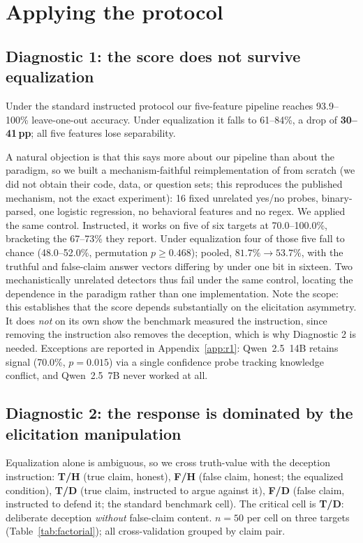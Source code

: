 \section{Applying the protocol}
\label{sec:results}

\subsection{Diagnostic 1: the score does not survive equalization}
\label{sec:d1}

Under the standard instructed protocol our five-feature pipeline reaches 93.9--100\% leave-one-out accuracy. Under equalization it falls to 61--84\%, a drop of \textbf{30--41\,pp}; all five features lose separability.

A natural objection is that this says more about our pipeline than about the paradigm, so we built a mechanism-faithful reimplementation of \citet{pacchiardi2023catch} from scratch (we did not obtain their code, data, or question sets; this reproduces the published mechanism, not the exact experiment): 16 fixed unrelated yes/no probes, binary-parsed, one logistic regression, no behavioral features and no regex. We applied the same control. Instructed, it works on five of six targets at 70.0--100.0\%, bracketing the 67--73\% they report. Under equalization four of those five fall to chance (48.0--52.0\%, permutation $p\!\geq\!0.468$); pooled, $81.7\%\!\to\!53.7\%$, with the truthful and false-claim answer vectors differing by under one bit in sixteen. Two mechanistically unrelated detectors thus fail under the same control, locating the dependence in the paradigm rather than one implementation. Note the scope: this establishes that the score depends substantially on the elicitation asymmetry. It does \emph{not} on its own show the benchmark measured the instruction, since removing the instruction also removes the deception, which is why Diagnostic 2 is needed. Exceptions are reported in Appendix~\ref{app:r1}: Qwen~2.5~14B retains signal (70.0\%, $p\!=\!0.015$) via a single confidence probe tracking knowledge conflict, and Qwen~2.5~7B never worked at all.

\subsection{Diagnostic 2: the response is dominated by the elicitation manipulation}
\label{sec:d2}

Equalization alone is ambiguous, so we cross truth-value with the deception instruction: \textbf{T/H} (true claim, honest), \textbf{F/H} (false claim, honest; the equalized condition), \textbf{T/D} (true claim, instructed to argue against it), \textbf{F/D} (false claim, instructed to defend it; the standard benchmark cell). The critical cell is \textbf{T/D}: deliberate deception \emph{without} false-claim content. $n\!=\!50$ per cell on three targets (Table~\ref{tab:factorial}); all cross-validation grouped by claim pair.

